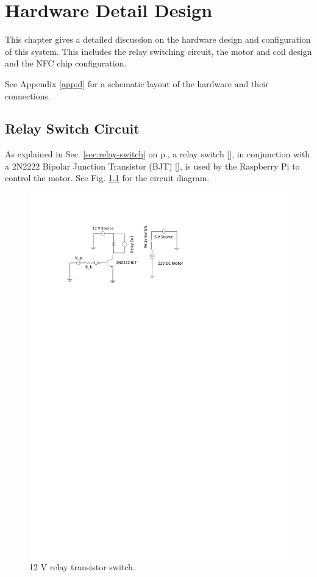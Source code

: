 \chapter{Hardware Detail Design}
\label{chap:5}

This chapter gives a detailed discussion on the hardware design and
configuration of this system. This includes the relay switching circuit, the
motor and coil design and the NFC chip configuration.

See Appendix \ref{app:d} for a schematic layout of the hardware and their
connections.

\section{Relay Switch Circuit}
\label{sec:detail-switch}

As explained in Sec. \ref{sec:relay-switch} on p.\pageref{sec:relay-switch}, a relay
switch [\cite{manual:relay-specs}], in conjunction with a 2N2222
Bipolar Junction Transistor (BJT) [\cite{maunual:transistor-datasheet}], is used
by the Raspberry Pi to control the motor. See Fig.
\ref{fig:relay-switch} for the circuit diagram.

\begin{figure}
\centering
\includegraphics[clip = true, trim = 70 640 0 70, scale=1.2]{relay_switch}
\caption{12 V relay transistor switch.}
\label{fig:relay-switch}
\end{figure}

